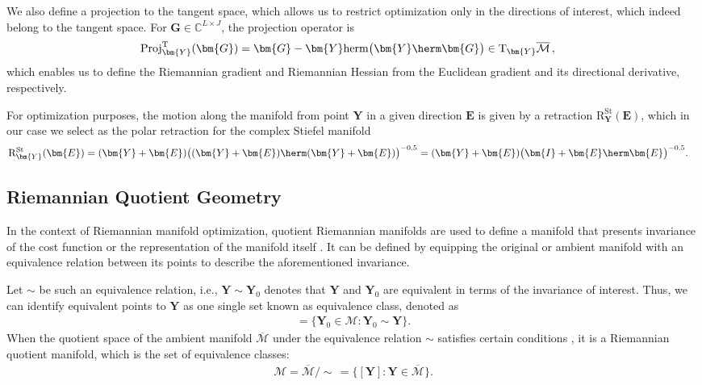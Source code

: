 We also define a projection to the tangent space, which allows us to restrict optimization only in the directions of interest, which indeed belong to the tangent space. 
For $\bm{G}\in\mathbb{C}^{L\times J}$, the projection operator is
\begin{align}
	\mathrm{Proj}_{\bm{Y}}^{\mathrm{T}}(\bm{G})&=\bm{G}-\bm{Y}\mathrm{herm}\big(\bm{Y}\herm
	\bm{G}\big)\in\mathrm{T}_{\bm{Y}}\overline{\mathcal{M}}\,,
\end{align}
which enables us to define the Riemannian gradient and Riemannian Hessian from the Euclidean gradient and its directional derivative, respectively.

For optimization purposes, the motion along the manifold from point $\bm{Y}$ in a given direction $\bm{E}$ is given by a retraction $\mathrm{R}_{\bm{Y}}^{\mathrm{St}}(\bm{E})$, which in our case we select as the polar retraction for the complex Stiefel manifold \cite{Edelman1999stiefel}
\begin{align}
	\mathrm{R}_{\bm{Y}}^{\mathrm{St}}(\bm{E})&=(\bm{Y}+\bm{E})\big((\bm{Y}+\bm{E})\herm
	(\bm{Y}+\bm{E})\big)^{-0.5}
	=(\bm{Y}+\bm{E})\big(\bm{I}+\bm{E}\herm
	\bm{E}\big)^{-0.5}.
\end{align}


\subsection{Riemannian Quotient Geometry}
In the context of Riemannian manifold optimization, quotient Riemannian manifolds are used to define a manifold that presents invariance of the cost function or the representation of the manifold itself  \cite{boumal2020intromanifolds}. 
It can be defined by equipping the original or ambient manifold with an equivalence relation between its points to describe the aforementioned invariance. 

Let $\sim$ be such an equivalence relation, i.e., $\bm{Y}\sim\bm{Y}_0$ denotes that $\bm{Y}$ and $\bm{Y}_0$ are equivalent in terms of the invariance of interest. 
Thus, we can identify equivalent points to $\bm{Y}$ as one single set known as equivalence class, denoted as 
\begin{align}
	[\bm{Y}]=\{\bm{Y}_0\in\mathcal{M}: \bm{Y}_0\sim\bm{Y}\}.
\end{align}
When the quotient space of the ambient manifold $\overline{\mathcal{M}}$ under the equivalence relation $\sim$ satisfies certain conditions \cite[Chapter 3]{Absil2008book}, it is a Riemannian quotient manifold, which is the set of equivalence classes:
\begin{align}
	\mathcal{M}=\overline{\mathcal{M}}/\!\sim\,=\big\{[\bm{Y}]:\bm{Y}\in\overline{\mathcal{M}}\big\}.
\end{align}

